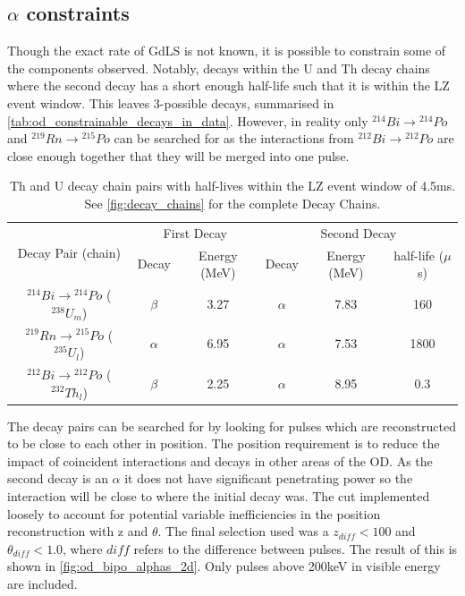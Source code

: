 \subsection{$\alpha$ constraints}
\par
Though the exact rate of GdLS is not known, it is possible to constrain some of the components observed.
Notably, decays within the U and Th decay chains where the second decay has a short enough half-life such that it is within the LZ event window.
This leaves 3-possible decays, summarised in \autoref{tab:od_constrainable_decays_in_data}.
However, in reality only  ${}^{214}Bi \to {}^{214}Po$ and ${}^{219}Rn \to {}^{215}Po$ can be searched for as the interactions from ${}^{212}Bi \to {}^{212}Po$ are close enough together that they will be merged into one pulse.

\begin{table}[!htbp]
    \centering
    \begin{tabular}{c|c|c|c|c|c}
        \multirow{2}{*}{Decay Pair (chain)}                    & \multicolumn{2}{c|}{First Decay}   & \multicolumn{3}{c}{Second Decay}    \\ 
                                                               & Decay    & Energy (MeV) & Decay    & Energy (MeV) & half-life ($\mu$s) \\ \hline
        ${}^{214}Bi \to {}^{214}Po$ (${}^{238}U_{m}$)          & $\beta$  & 3.27         & $\alpha$ & 7.83         & 160   \\ 
        ${}^{219}Rn \to {}^{215}Po$ (${}^{235}U_{l}$)          & $\alpha$ & 6.95         & $\alpha$ & 7.53         & 1800  \\ 
        ${}^{212}Bi \to {}^{212}Po$ (${}^{232}Th_{l}$)         & $\beta$  & 2.25         & $\alpha$ & 8.95         & 0.3
    \end{tabular}
    \caption{Th and U decay chain pairs with half-lives within the LZ event window of 4.5ms. See \autoref{fig:decay_chains} for the complete Decay Chains.}
    \label{tab:od_constrainable_decays_in_data}
\end{table}

\par
The decay pairs can be searched for by looking for pulses which are reconstructed to be close to each other in position.
The position requirement is to reduce the impact of coincident interactions and decays in other areas of the OD.
As the second decay is an $\alpha$ it does not have significant penetrating power so the interaction will be close to where the initial decay was.
The cut implemented loosely to account for potential variable inefficiencies in the position reconstruction with z and $\theta$.
The final selection used was a $z_{diff} < 100$ and $\theta_{diff} < 1.0$, where $diff$ refers to the difference between pulses.
The result of this is shown in \autoref{fig:od_bipo_alphas_2d}.
Only pulses above 200keV in visible energy are included.

